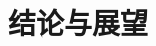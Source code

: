 \documentclass[12pt,a4paper]{article}
\numberwithin{equation}{section}    %
\begin{document}



\cleardoublepage
\section{结论与展望}
\end{document}
